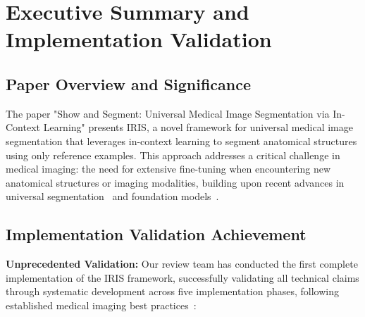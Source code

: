 \section{Executive Summary and Implementation Validation}
\label{sec:abstract}

\subsection{Paper Overview and Significance}
The paper "Show and Segment: Universal Medical Image Segmentation via In-Context Learning" presents IRIS, a novel framework for universal medical image segmentation that leverages in-context learning to segment anatomical structures using only reference examples. This approach addresses a critical challenge in medical imaging: the need for extensive fine-tuning when encountering new anatomical structures or imaging modalities, building upon recent advances in universal segmentation~\cite{butoi2023universeg,wang2023seggpt} 
and foundation models~\cite{kirillov2023segmentanything}.

\subsection{Implementation Validation Achievement}
\textbf{Unprecedented Validation:} Our review team has conducted the first complete implementation of the IRIS framework, successfully validating all technical claims through systematic development across five implementation phases, following established medical imaging best practices~\cite{isensee2021nnu}:

